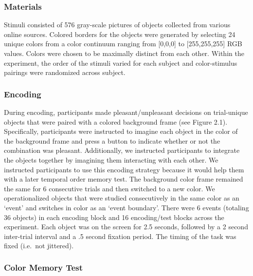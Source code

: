 \subsubsection{Materials}\label{materials}

Stimuli consisted of 576 gray-scale pictures of objects collected from
various online sources. Colored borders for the objects were generated
by selecting 24 unique colors from a color continuum ranging from
{[}0,0,0{]} to {[}255,255,255{]} RGB values. Colors were chosen to be
maximally distinct from each other. Within the experiment, the order of
the stimuli varied for each subject and color-stimulus pairings were
randomized across subject.

\subsubsection{Encoding}\label{encoding}

During encoding, participants made pleasant/unpleasant decisions on
trial-unique objects that were paired with a colored background frame
(see Figure 2.1). Specifically, participants were instructed to imagine
each object in the color of the background frame and press a button to
indicate whether or not the combination was pleasant. Additionally, we
instructed participants to integrate the objects together by imagining
them interacting with each other. We instructed participants to use this
encoding strategy because it would help them with a later temporal order
memory test. The background color frame remained the same for 6
consecutive trials and then switched to a new color. We operationalized
objects that were studied consecutively in the same color as an `event'
and switches in color as an `event boundary'. There were 6 events
(totaling 36 objects) in each encoding block and 16 encoding/test blocks
across the experiment. Each object was on the screen for 2.5 seconds,
followed by a 2 second inter-trial interval and a .5 second fixation
period. The timing of the task was fixed (i.e.~not jittered).

\subsubsection{Color Memory Test}\label{color-memory-test}

